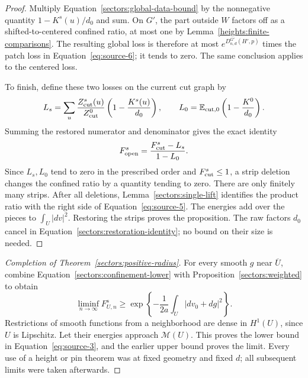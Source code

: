 \begin{proof}
Multiply Equation~\eqref{sectors:global-data-bound} by the
nonnegative quantity \(1-K^s(u)/d_0\) and sum.
On \(G'\), the part outside \(W\) factors off as a
shifted-to-centered confined ratio, at most one by
Lemma~\ref{heights:finite-comparisons}.
The resulting global loss is therefore at most
\(e^{D_{n,d}^{G'}(H',p)}\) times the patch loss in
Equation~\eqref{eq:source-6}; it tends to zero.
The same conclusion applies to the centered loss.

To finish, define these two losses on the current cut graph by
\[
 L_s=\sum_u\frac{Z_{\rm cut}^s(u)}{Z_{\rm cut}^0}
                 \left(1-\frac{K^s(u)}{d_0}\right),
 \qquad
 L_0=\mathbb E_{{\rm cut},0}\left(1-\frac{K^0}{d_0}\right).
\]
Summing the restored numerator and denominator gives the exact identity
\begin{equation}
 F_{\rm open}^s=\frac{F_{\rm cut}^s-L_s}{1-L_0}.
 \label{sectors:restoration-identity}
\end{equation}
Since \(L_s,L_0\) tend to zero in the prescribed order and
\(F_{\rm cut}^s\le1\), a strip deletion changes the confined ratio
by a quantity tending to zero. There are only finitely many strips.
After all deletions, Lemma~\ref{sectors:single-lift} identifies the
product ratio with the right side of Equation~\eqref{eq:source-5}.
The energies add over the pieces to \(\int_U|dv|^2\).
Restoring the strips proves the proposition. The raw factors \(d_0\)
cancel in Equation~\eqref{sectors:restoration-identity}; no bound on
their size is needed.
\end{proof}

\begin{proof}[Completion of Theorem~\ref{sectors:positive-radius}]
For every smooth \(g\) near \(\overline U\), combine
Equation~\eqref{sectors:confinement-lower} with
Proposition~\ref{sectors:weighted} to obtain
\[
 \liminf_{n\to\infty}F_{U,n}^s
 \ge \exp\left\{-\frac1{2a}\int_U|dv_0+dg|^2\right\}.
\]
Restrictions of smooth functions from a neighborhood are dense in
\(H^1(U)\), since \(U\) is Lipschitz. Let their energies approach
\(\mathcal M(U)\). This proves the lower bound in
Equation~\eqref{eq:source-3}, and the earlier upper bound proves the
limit. Every use of a height or pin theorem was at fixed geometry
and fixed \(d\); all subsequent limits were taken afterwards.
\end{proof}
